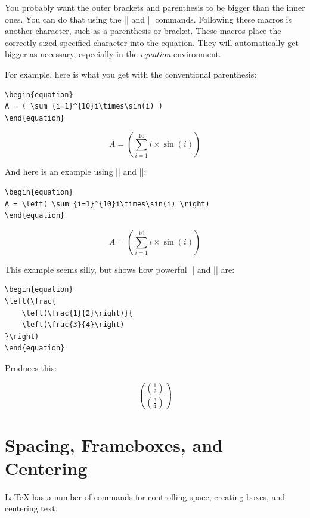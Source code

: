 You probably want the outer brackets and parenthesis to be bigger than the
inner ones. You can do that using the |\left| and |\right| commands.  Following
these macros is another character, such as a parenthesis or bracket.  These
macros place the correctly sized specified character into the equation.  They
will automatically get bigger as necessary, especially in the \emph{equation}
environment.

For example, here is what you get with the conventional parenthesis:
\begin{Verbatim}
\begin{equation}
A = ( \sum_{i=1}^{10}i\times\sin(i) )
\end{equation}
\end{Verbatim}

\begin{equation}
A = ( \sum_{i=1}^{10}i\times\sin(i) )
\end{equation}

And here is an example using |\left| and |\right|:

\begin{Verbatim}
\begin{equation}
A = \left( \sum_{i=1}^{10}i\times\sin(i) \right)
\end{equation}
\end{Verbatim}

\begin{equation}
A = \left( \sum_{i=1}^{10}i\times\sin(i) \right)
\end{equation}

This example  seems silly, but shows  how powerful
|\left| and |\right|  are:

\begin{Verbatim}
\begin{equation}
\left(\frac{
    \left(\frac{1}{2}\right)}{
    \left(\frac{3}{4}\right)
}\right)
\end{equation}
\end{Verbatim}

Produces this:

\begin{equation}
\left(\frac{
    \left(\frac{1}{2}\right)}{
    \left(\frac{3}{4}\right)
}\right)
\end{equation}



\section{Spacing, Frameboxes, and Centering}
\LaTeX{} has a number of commands for controlling space, creating
boxes, and centering text.

